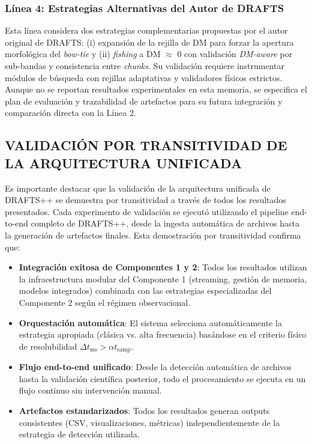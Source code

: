\subsubsection{Línea 4: Estrategias Alternativas del Autor de DRAFTS}

Esta línea considera dos estrategias complementarias propuestas por el autor original de DRAFTS: (i) expansión de la rejilla de DM para forzar la apertura morfológica del \emph{bow-tie} y (ii) \emph{fishing} a DM \(\approx\) 0 con validación \emph{DM-aware} por sub-bandas y consistencia entre \emph{chunks}. Su validación requiere instrumentar módulos de búsqueda con rejillas adaptativas y validadores físicos estrictos. Aunque no se reportan resultados experimentales en esta memoria, se especifica el plan de evaluación y trazabilidad de artefactos para su futura integración y comparación directa con la Línea 2.

\subsection{VALIDACIÓN POR TRANSITIVIDAD DE LA ARQUITECTURA UNIFICADA}

Es importante destacar que la validación de la arquitectura unificada de DRAFTS++ se demuestra por transitividad a través de todos los resultados presentados. Cada experimento de validación se ejecutó utilizando el pipeline end-to-end completo de DRAFTS++, desde la ingesta automática de archivos hasta la generación de artefactos finales. Esta demostración por transitividad confirma que:

\begin{itemize}
    \item \textbf{Integración exitosa de Componentes 1 y 2}: Todos los resultados utilizan la infraestructura modular del Componente 1 (streaming, gestión de memoria, modelos integrados) combinada con las estrategias especializadas del Componente 2 según el régimen observacional.
    \item \textbf{Orquestación automática}: El sistema selecciona automáticamente la estrategia apropiada (clásica vs. alta frecuencia) basándose en el criterio físico de resolubilidad $\Delta t_{\mathrm{ms}} > \alpha t_{\mathrm{samp}}$.
    \item \textbf{Flujo end-to-end unificado}: Desde la detección automática de archivos hasta la validación científica posterior, todo el procesamiento se ejecuta en un flujo continuo sin intervención manual.
    \item \textbf{Artefactos estandarizados}: Todos los resultados generan outputs consistentes (CSV, visualizaciones, métricas) independientemente de la estrategia de detección utilizada.
\end{itemize}

